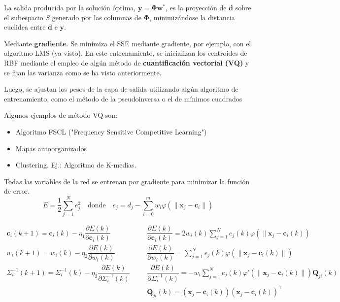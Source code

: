 La salida producida por la solución óptima, $\mathbf{y=\Phi w^*}$, es la proyección de $\mathbf{d}$ sobre el subespacio $S$ generado por las columnas de $\mathbf{\Phi}$, minimizándose la distancia euclidea entre $\mathbf{d}$ e $\mathbf{y}$.

Mediante \textbf{gradiente}. Se minimiza el SSE mediante gradiente, por ejemplo, con el algoritmo LMS (ya visto).
En este entrenamiento, se inicializan los centroides de RBF mediante el empleo de algún método de \textbf{cuantificación vectorial (VQ)} y se fijan las varianza como se ha visto anteriormente.

Luego, se ajustan los pesos de la capa de salida utilizando algún algoritmo de entrenamiento, como el método de la pseudoinversa o el de mínimos cuadrados

Algunos ejemplos de método VQ son:
\begin{itemize}
\item Algoritmo FSCL ("Frequency Sensitive Competitive Learning")
\item Mapas autoorganizados
\item Clustering. Ej.: Algoritmo de K-medias.
\end{itemize}
Todas las variables de la red se entrenan por gradiente para minimizar la función de error. \[ \boxed{E=\dfrac{1}{2}\sum_{j=1}^{N}e_j^2}\quad\mathrm{donde}\quad e_j=d_j-\sum_{i=0}^{m}w_i\varphi(\|\mathbf{x}_j-\mathbf{c}_i\|) \]

\[ \begin{array}{rcl}
	\mathbf{c}_i(k+1)=\mathbf{c}_i(k)-\eta_1\dfrac{\partial E(k)}{\partial \mathbf{c}_i(k)} & ~~~~ &\dfrac{\partial E(k)}{\partial \mathbf{c}_i(k)}=2w_i(k)\sum_{j=1}^Ne_j(k)\varphi(\|\mathbf{x}_j-\mathbf{c}_i(k)) \\
	w_{i}(k+1)=w_{i}(k)-\eta_{2}\dfrac{ \partial E(k) }{ \partial w_{i}(k) }  & &\dfrac{ \partial E(k) }{ \partial w_{i}(k) }=\sum_{j=1}^{N}e_{j}(k)\varphi(\|\mathbf{x}_{j}-\mathbf{c}_{i}(k) \|)  \\
	\Sigma_{i}^{-1}(k+1)=\Sigma_{i}^{-1}(k)-\eta_{3}\dfrac{ \partial E(k) }{ \partial \Sigma_{i}^{-1}(k) }  & &\dfrac{ \partial E(k) }{ \partial \Sigma_{i}^{-1}(k) } =-w_{i}\sum_{j=1}^{N}e_{j}(k)\varphi'(\|\mathbf{x}_{j}-\mathbf{c}_{i}(k)\|)\mathbf{Q}_{ji}(k) \\
	& & \mathbf{Q}_{ji}(k)=(\mathbf{x}_{j}-\mathbf{c}_{i}(k))(\mathbf{x}_{j}-\mathbf{c}_{i}(k))^{\intercal}
\end{array}  \]